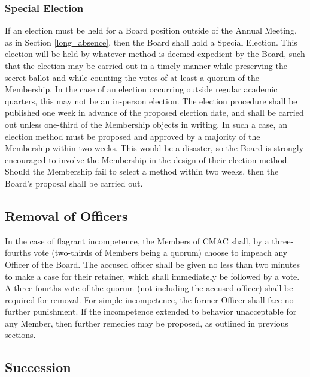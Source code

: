 \documentclass{article}
\begin{document}
\subsubsection{Special Election} \label{special_election}
If an election must be held for a Board position outside of the Annual Meeting,
as in Section \ref{long_absence}, then the Board shall hold a Special
Election. This election will be held by whatever method is deemed expedient by
the Board, such that the election may be carried out in a timely manner while
preserving the secret ballot and while counting the votes of at least a quorum
of the Membership. In the case of an election occurring outside
regular academic quarters, this may not be an in-person election. The election
procedure shall be published one week in advance of the proposed election date,
and shall be carried out unless one-third of the Membership objects in
writing. In such a case, an election method must be proposed and approved by a
majority of the Membership within two weeks. This would be a disaster, so the
Board is strongly encouraged to involve the Membership in the design of their
election method. Should the Membership fail to select a method within two weeks,
then the Board's proposal shall be carried out.

\subsection{Removal of Officers}

In the case of flagrant incompetence, the Members of CMAC shall, by a
three-fourths vote (two-thirds of Members being a quorum) choose to impeach any
Officer of the Board. The accused officer shall be given no less than two
minutes to make a case for their retainer, which shall immediately be followed by
a vote. A three-fourths vote of the quorum (not including the accused officer)
shall be required for removal. For simple incompetence, the former Officer shall
face no further punishment. If the incompetence extended to behavior
unacceptable for any Member, then further remedies may be proposed, as outlined
in previous sections.

\subsection{Succession}

\end{document}

